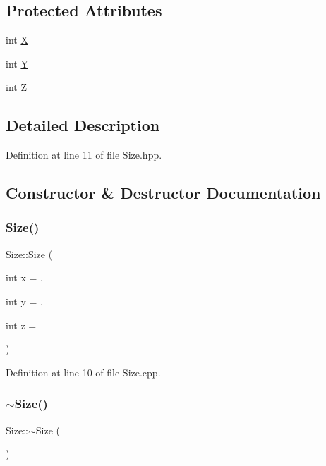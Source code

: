 \subsection*{Protected Attributes}
\begin{DoxyCompactItemize}
\item 
int \mbox{\hyperlink{class_size_a5d467b20f596f0c48ad63d3458a59f01}{X}}
\item 
int \mbox{\hyperlink{class_size_a5b140bf13607c8624f04dde5391f53d5}{Y}}
\item 
int \mbox{\hyperlink{class_size_a80d24eaccc30b2781323b9bff4f0df05}{Z}}
\end{DoxyCompactItemize}


\subsection{Detailed Description}


Definition at line 11 of file Size.\+hpp.



\subsection{Constructor \& Destructor Documentation}
\mbox{\label{class_size_a232d7081f3ca430ac09ceab05d1f1179}} 
\subsubsection{\texorpdfstring{Size()}{Size()}}
{\footnotesize\ttfamily Size\+::\+Size (\begin{DoxyParamCaption}\item[{int}]{x = {},  }\item[{int}]{y = {},  }\item[{int}]{z = {} }\end{DoxyParamCaption})}



Definition at line 10 of file Size.\+cpp.

\mbox{\label{class_size_a0d82fe638fc5a83beee67e2cc91d284e}} 
\subsubsection{\texorpdfstring{$\sim$\+Size()}{~Size()}}
{\footnotesize\ttfamily Size\+::$\sim$\+Size (\begin{DoxyParamCaption}{ }\end{DoxyParamCaption})}



